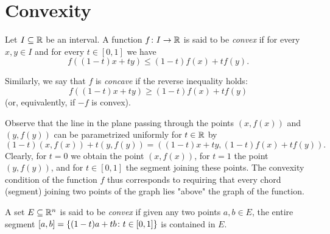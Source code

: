 \section{Convexity}
%
%

\begin{definition}
\mymark{**}
Let $I\subseteq {\mathbb R}$ be an interval.
A function $f\colon I\to {\mathbb R}$
is said to be
\emph{convex}
%
%
%
if for every $x,y\in I$ and for every $t\in [0,1]$ we have
\[
f((1-t)x + ty) \le (1-t) f(x) + t f(y).
\]

Similarly, we say that $f$ is \emph{concave} 
%
%
%
if the reverse inequality holds:
\[
f((1-t)x + ty) \ge (1-t) f(x) + t f(y)
\]
(or, equivalently, if $-f$ is convex).
\end{definition}

Observe that the line in the plane passing through the points $(x,f(x))$ and
$(y,f(y))$ can be parametrized uniformly for $t\in {\mathbb R}$
by
\[
  (1-t) (x,f(x)) + t(y,f(y)) = ((1-t)x + ty, (1-t) f(x) + tf(y)).
\]
Clearly, for $t=0$ we obtain the point $(x,f(x))$, for $t=1$ the point
$(y,f(y))$, and for $t\in[0,1]$ the segment joining these points. The convexity
condition of the function $f$ thus corresponds to requiring that every chord
(segment) joining two points of the graph lies "above" the graph of the
function.

\begin{definition}
\mymark{*}
A set $E\subseteq {\mathbb R}^n$ is said to be \emph{convex}%
%
 if given
any two points $a,b\in E$, the entire segment $[a,b]={\left\{ (1-t)a+tb\colon
t\in [0,1] \right\}}$ is contained in $E$.
\end{definition}

